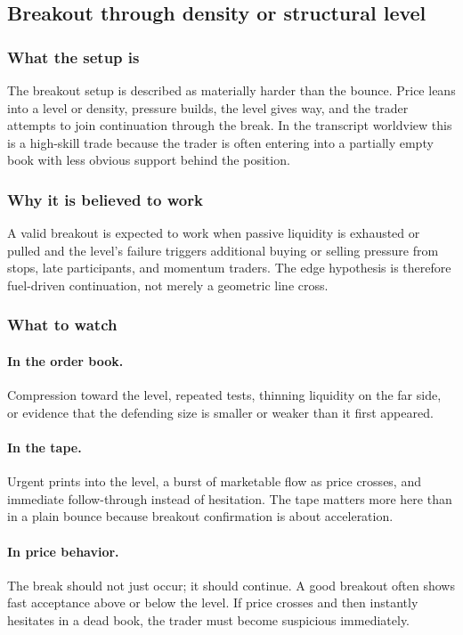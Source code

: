 \subsection{Breakout through density or structural level}

\subsubsection{What the setup is}

The breakout setup is described as materially harder than the bounce. Price leans into a level
or density, pressure builds, the level gives way, and the trader attempts to join continuation
through the break. In the transcript worldview this is a high-skill trade because the trader is
often entering into a partially empty book with less obvious support behind the position.

\subsubsection{Why it is believed to work}

A valid breakout is expected to work when passive liquidity is exhausted or pulled and the
level's failure triggers additional buying or selling pressure from stops, late participants,
and momentum traders. The edge hypothesis is therefore fuel-driven continuation, not merely a
geometric line cross.

\subsubsection{What to watch}

\paragraph{In the order book.}
Compression toward the level, repeated tests, thinning liquidity on the far side, or evidence
that the defending size is smaller or weaker than it first appeared.

\paragraph{In the tape.}
Urgent prints into the level, a burst of marketable flow as price crosses, and immediate
follow-through instead of hesitation. The tape matters more here than in a plain bounce because
breakout confirmation is about acceleration.

\paragraph{In price behavior.}
The break should not just occur; it should continue. A good breakout often shows fast
acceptance above or below the level. If price crosses and then instantly hesitates in a dead
book, the trader must become suspicious immediately.


